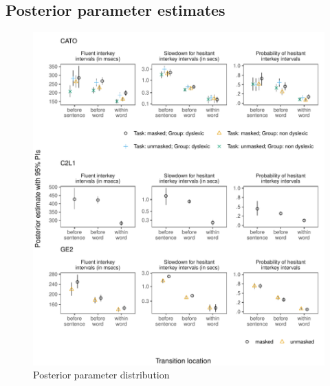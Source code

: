 \clearpage
\makeatletter
\efloat@restorefloats
\makeatother


\begin{appendix}
\section{}
\hypertarget{posterior-parameter-estimates}{%
\subsection{Posterior parameter
estimates}\label{posterior-parameter-estimates}}

\begin{figure}[!htb]
\centering
\includegraphics{figures/psplots1.pdf}
\caption{Posterior parameter distribution}
\end{figure}
\newpage
\begin{figure}[!htb]
\ContinuedFloat
\captionsetup{list=off,format=cont}
\centering

\end{figure}
\end{appendix}

